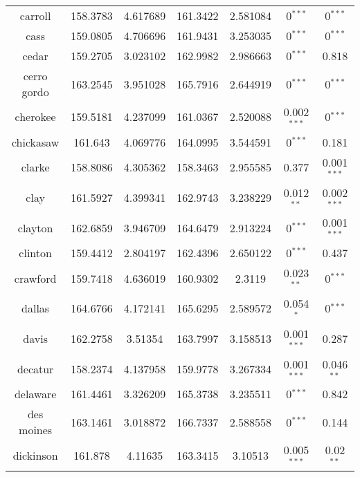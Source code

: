 \begin{table}[]
\begin{tabular}{|c|cc|cc|cc|}
carroll       & 158.3783  & 4.617689          & 161.3422  & 2.581084          & 0$^{***}$     & 0$^{***}$     \\
cass          & 159.0805  & 4.706696          & 161.9431  & 3.253035          & 0$^{***}$     & 0$^{***}$     \\
cedar         & 159.2705  & 3.023102          & 162.9982  & 2.986663          & 0$^{***}$     & 0.818                         \\
cerro gordo   & 163.2545  & 3.951028          & 165.7916  & 2.644919          & 0$^{***}$     & 0$^{***}$     \\
cherokee      & 159.5181  & 4.237099          & 161.0367  & 2.520088          & 0.002$^{***}$ & 0$^{***}$     \\
chickasaw     & 161.643   & 4.069776          & 164.0995  & 3.544591          & 0$^{***}$     & 0.181                         \\
clarke        & 158.8086  & 4.305362          & 158.3463  & 2.955585          & 0.377                         & 0.001$^{***}$ \\
clay          & 161.5927  & 4.399341          & 162.9743  & 3.238229          & 0.012$^{**}$  & 0.002$^{***}$ \\
clayton       & 162.6859  & 3.946709          & 164.6479  & 2.913224          & 0$^{***}$     & 0.001$^{***}$ \\
clinton       & 159.4412  & 2.804197          & 162.4396  & 2.650122          & 0$^{***}$     & 0.437                         \\
crawford      & 159.7418  & 4.636019          & 160.9302  & 2.3119            & 0.023$^{**}$  & 0$^{***}$     \\
dallas        & 164.6766  & 4.172141          & 165.6295  & 2.589572          & 0.054$^{*}$   & 0$^{***}$     \\
davis         & 162.2758  & 3.51354           & 163.7997  & 3.158513          & 0.001$^{***}$ & 0.287                         \\
decatur       & 158.2374  & 4.137958          & 159.9778  & 3.267334          & 0.001$^{***}$ & 0.046$^{**}$  \\
delaware      & 161.4461  & 3.326209          & 165.3738  & 3.235511          & 0$^{***}$     & 0.842                         \\
des moines    & 163.1461  & 3.018872          & 166.7337  & 2.588558          & 0$^{***}$     & 0.144                         \\
dickinson     & 161.878   & 4.11635           & 163.3415  & 3.10513           & 0.005$^{***}$ & 0.02$^{**}$   \\

\end{tabular}
\end{table}
